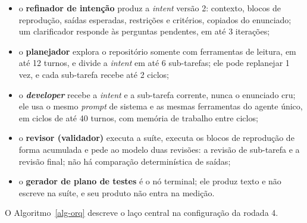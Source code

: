 \begin{itemize}
    \item o \textbf{refinador de intenção} produz a \textit{intent} versão 2: contexto, blocos de reprodução, saídas esperadas, restrições e critérios, copiados do enunciado; um clarificador responde às perguntas pendentes, em até 3 iterações;
    \item o \textbf{planejador} explora o repositório somente com ferramentas de leitura, em até 12 turnos, e divide a \textit{intent} em até 6 sub-tarefas; ele pode replanejar 1 vez, e cada sub-tarefa recebe até 2 ciclos;
    \item o \textbf{\textit{developer}} recebe a \textit{intent} e a sub-tarefa corrente, nunca o enunciado cru; ele usa o mesmo \textit{prompt} de sistema e as mesmas ferramentas do agente único, em ciclos de até 40 turnos, com memória de trabalho entre ciclos;
    \item o \textbf{revisor (validador)} executa a suíte, executa os blocos de reprodução de forma acumulada e pede ao modelo duas revisões: a revisão de sub-tarefa e a revisão final; não há comparação determinística de saídas;
    \item o \textbf{gerador de plano de testes} é o nó terminal; ele produz texto e não escreve na suíte, e seu produto não entra na medição.
\end{itemize}

O Algoritmo~\ref{alg-orq} descreve o laço central na configuração da rodada 4.

